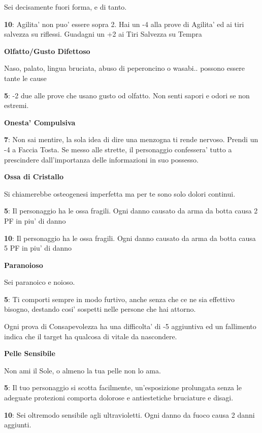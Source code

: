 \documentclass[a4paper,11pt,twoside,openany]{book}
\begin{document}
{		Sei decisamente fuori forma, e di tanto.
		
		\textbf{10}: Agilita' non puo' essere sopra 2. Hai un -4 alla prove di Agilita' ed ai tiri salvezza su riflessi. Guadagni un +2 ai Tiri Salvezza su Tempra
		
		\textbf{Olfatto/Gusto Difettoso}
		
		Naso, palato, lingua bruciata, abuso di peperoncino o wasabi.. possono essere tante le cause
		
		\textbf{5}: -2 due alle prove che usano gusto od olfatto. Non senti sapori e odori se non estremi.
		
		\textbf{Onesta' Compulsiva}
		
		\textbf{7}: Non sai mentire, la sola idea di dire una menzogna ti rende nervoso. Prendi un -4 a Faccia Tosta. Se messo alle strette, il personaggio confessera' tutto a prescindere dall'importanza delle informazioni in suo possesso.
		
		\textbf{Ossa di Cristallo}
		
		Si chiamerebbe osteogenesi imperfetta ma per te sono solo dolori continui.
		
		\textbf{5}: Il personaggio ha le ossa fragili. Ogni danno causato da arma da botta causa 2 PF in piu' di danno
		
		\textbf{10}: Il personaggio ha le ossa fragili. Ogni danno causato da arma da botta causa 5 PF in piu' di danno
		
		\textbf{Paranoioso}
		
		Sei paranoico e noioso.
		
		\textbf{5}: Ti comporti sempre in modo furtivo, anche senza che ce ne sia effettivo bisogno, destando cosi' sospetti nelle persone che hai attorno.
		
		Ogni prova di Consapevolezza ha una difficolta' di -5 aggiuntiva ed un fallimento indica che il target ha qualcosa di vitale da nascondere.
		
		\textbf{Pelle Sensibile}
		
		Non ami il Sole, o almeno la tua pelle non lo ama.
		
		\textbf{5}: Il tuo personaggio si scotta facilmente, un'esposizione prolungata senza le adeguate protezioni comporta dolorose e antiestetiche bruciature e disagi.
		
		\textbf{10}: Sei oltremodo sensibile agli ultravioletti. Ogni danno da fuoco causa 2 danni aggiunti.
		
}
\end{document}
